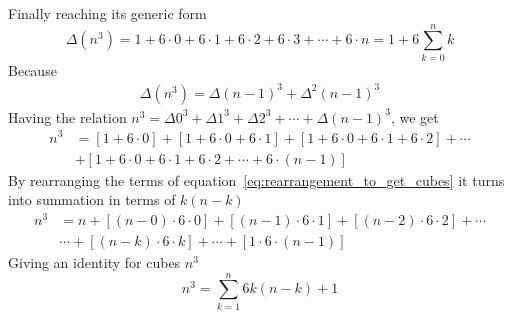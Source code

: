 Finally reaching its generic form
\begin{equation}
    \Delta(n^3) = 1+6\cdot0+6\cdot1+6\cdot2+6\cdot3+\cdots+6\cdot n = 1 + 6 \sum_{k=0}^{n} k
    \label{eq:general-cube-eq}
\end{equation}
Because
\begin{align*}
    \Delta(n^3) = \Delta (n-1)^3 + \Delta^2 (n-1)^3
\end{align*}
Having the relation $n^3 = \Delta 0^3 + \Delta 1^3 + \Delta 2^3 + \cdots + \Delta (n-1)^3$,
we get
\begin{align}
    \label{eq:rearrangement_to_get_cubes}
    n^3 &= [1+6\cdot0]+[1+6\cdot0+6\cdot1]+[1+6\cdot0+6\cdot1+6\cdot2]+\cdots \nonumber \\
    &+[1+6\cdot0+6\cdot1+6\cdot2+\cdots+6\cdot(n-1)]
\end{align}
By rearranging the terms of equation~\eqref{eq:rearrangement_to_get_cubes} it turns into summation
in terms of $k (n-k)$
\begin{equation*}
    \begin{split}
        n^3 &= n + [(n-0) \cdot 6 \cdot 0] + [(n-1)\cdot6\cdot1] + [(n-2)\cdot6\cdot2] + \cdots \\
        &\cdots + [(n-k)\cdot 6 \cdot k] + \cdots + [1\cdot6\cdot(n-1)]
    \end{split}
\end{equation*}
Giving an identity for cubes $n^3$
\begin{equation}
    \label{eq:cube_identity}
    n^3 = \sum_{k=1}^{n} 6k(n-k) + 1
\end{equation}

